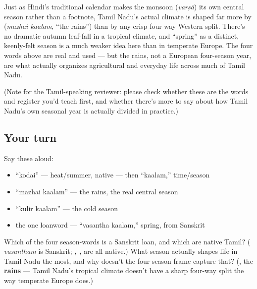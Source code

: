 \begin{culture}
Just as Hindi's traditional calendar makes the monsoon (\emph{varṣā}) its own central season rather than a footnote, Tamil Nadu's actual climate is shaped far more by \textbf{} (\emph{mazhai kaalam}, \textquotedblleft{}the rains\textquotedblright{}) than by any crisp four-way Western split. There's no dramatic autumn leaf-fall in a tropical climate, and \textquotedblleft{}spring\textquotedblright{} as a distinct, keenly-felt season is a much weaker idea here than in temperate Europe. The four words above are real and used — but the rains, not a European four-season year, are what actually organizes agricultural and everyday life across much of Tamil Nadu.

(Note for the Tamil-speaking reviewer: please check whether these are the words and register you'd teach first, and whether there's more to say about how Tamil Nadu's own seasonal year is actually divided in practice.)
\end{culture}

\subsection*{Your turn}
Say these aloud:

\begin{itemize}
\raggedright
  \item \textquotedblleft{}kodai\textquotedblright{} — heat/summer, native — then \textquotedblleft{}kaalam,\textquotedblright{} time/season
  \item \textquotedblleft{}mazhai kaalam\textquotedblright{} — the rains, the real central season
  \item \textquotedblleft{}kulir kaalam\textquotedblright{} — the cold season
  \item the one loanword — \textquotedblleft{}vasantha kaalam,\textquotedblright{} spring, from Sanskrit
\end{itemize}

\begin{tcolorbox}[breakable,colback=teal!4,colframe=teal!35!black,title={Before you move on}]
Which of the four season-words is a Sanskrit loan, and which are native Tamil? (\textbf{} \emph{vasantham} is Sanskrit; \textbf{, , } are all native.) What season actually shapes life in Tamil Nadu the most, and why doesn't the four-season frame capture that? (\textbf{}, the \textbf{rains} — Tamil Nadu's tropical climate doesn't have a sharp four-way split the way temperate Europe does.)
\end{tcolorbox}
